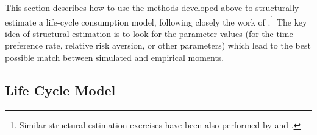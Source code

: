 \documentclass[titlepage, headings=optiontotocandhead]{\econtex}
\newcommand{\Mma}{\textit{Mathematica}}
\begin{document}
This section describes how to use the methods developed above to
structurally estimate a life-cycle consumption model, following
closely the work of
\cite{cagettiWprofiles}.\footnote{Similar structural
  estimation exercises have been also performed by
  \cite{palumbo:medical} and \cite{gpLifecycle}.} The key idea of
structural estimation is to look for the parameter values (for the
time preference rate, relative risk aversion, or other parameters)
which lead to the best possible match between simulated and empirical
moments.  %

\hypertarget{LifeCycleModel}{}
\subsection{Life Cycle Model}
\newcommand{\byage}{\hat}
\end{document}
